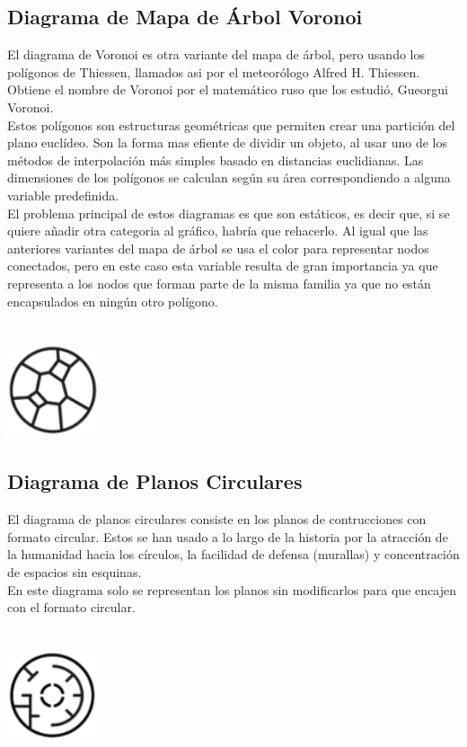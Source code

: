 \documentclass{article}\usepackage[]{graphicx}\usepackage[]{color}
\begin{document}
\subsection{Diagrama de Mapa de \'Arbol Voronoi}
El diagrama de Voronoi es otra variante del mapa de \'arbol, pero usando los pol\'igonos de Thiessen, llamados asi por el meteor\'ologo Alfred H. Thiessen. Obtiene el nombre de Voronoi por el matem\'atico ruso que los estudi\'o, Gueorgui Voronoi.~\\
Estos pol\'igonos son estructuras geom\'etricas que permiten crear una partici\'on del plano eucl\'ideo. Son la forma mas efiente de dividir un objeto, al usar uno de los m\'etodos de interpolaci\'on m\'as simples basado en distancias euclidianas. Las dimensiones de los pol\'igonos se calculan seg\'un su \'area correspondiendo a alguna variable predefinida. ~\\
El problema principal de estos diagramas es que son est\'aticos, es decir que, si se quiere a\~nadir otra categoria al gr\'afico, habr\'ia que rehacerlo. Al igual que las anteriores variantes del mapa de \'arbol se usa el color para representar nodos conectados, pero en este caso esta variable resulta de gran importancia ya que representa a los nodos que forman parte de la misma familia ya que no est\'an encapsulados en ning\'un otro pol\'igono.
~\\~\\~\\
\vbox{
    \centering
    \includegraphics[width=0.2\textwidth]{imag/poli}
}
\clearpage
\subsection{Diagrama de Planos Circulares}
El diagrama de planos circulares consiste en los planos de contrucciones con formato circular. Estos se han usado a lo largo de la historia por la atracci\'on de la humanidad hacia los c\'irculos, la facilidad de defensa (murallas) y concentraci\'on de espacios sin esquinas.~\\
En este diagrama solo se representan los planos sin modificarlos para que encajen con el formato circular.
~\\~\\~\\
\vbox{
    \centering
    \includegraphics[width=0.2\textwidth]{imag/planos}
}
\end{document}
